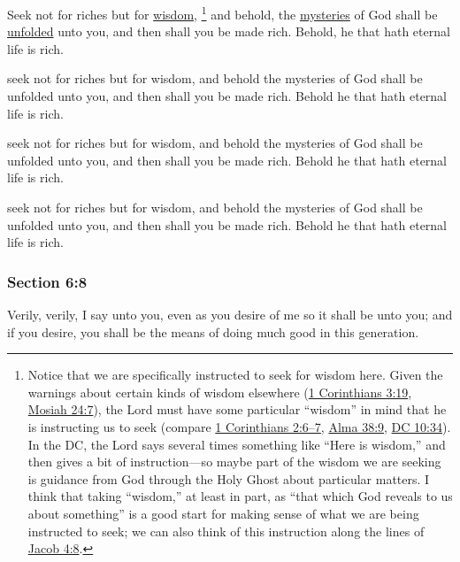 		Seek not for riches but for \hyperref[WISDOM]{wisdom},%
			\footnote{%
				Notice that we are specifically instructed to seek for wisdom here. Given the warnings about certain kinds of wisdom elsewhere (\hyperref[1CORINTHIANS-3-19]{1 Corinthians 3:19}, \hyperref[MOSIAH-24-7]{Mosiah 24:7}), the Lord must have some particular ``wisdom'' in mind that he is instructing us to seek (compare \hyperref[1CORINTHIANS-2-6]{1 Corinthians 2:6--7}, \hyperref[ALMA-38-9]{Alma 38:9}, \hyperref[DC10-34]{DC 10:34}). In the DC, the Lord says several times something like ``Here is wisdom,'' and then gives a bit of instruction---so maybe part of the wisdom we are seeking is guidance from God through the Holy Ghost about particular matters. I think that taking ``wisdom,'' at least in part, as ``that which God reveals to us about something'' is a good start for making sense of what we are being instructed to seek; we can also think of this instruction along the lines of \hyperref[JACOB-4-8]{Jacob 4:8}.
				}
		and behold, the \hyperref[MYSTERY]{mysteries} of God shall be \hyperref[UNFOLD]{unfolded} unto you, and then shall you be made rich. Behold, he that hath eternal life is rich.

		\begin{framed}
		\scriptsize
			\begin{compactdesc}
				\item[JSP] seek not for riches but for wisdom, and behold the mysteries of God shall be unfolded unto you, and then shall you be made rich. Behold he that hath eternal life is rich.
				\item[DC 1835] seek not for riches but for wisdom, and behold the mysteries of God shall be unfolded unto you, and then shall you be made rich. Behold he that hath eternal life is rich.
				\item[DC 1844] seek not for riches but for wisdom, and behold the mysteries of God shall be unfolded unto you, and then shall you be made rich. Behold he that hath eternal life is rich.
			\end{compactdesc}
		\end{framed}

	\subsubsection{Section 6:8} %
		\label{DC6-8}

		Verily, verily, I say unto you, even as you desire of me so it shall be unto you; and if you desire, you shall be the means of doing much good in this generation.

